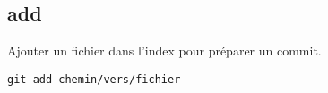 \subsection*{add}
Ajouter un fichier dans l'index pour préparer un commit.
\begin{verbatim}
git add chemin/vers/fichier
\end{verbatim}

